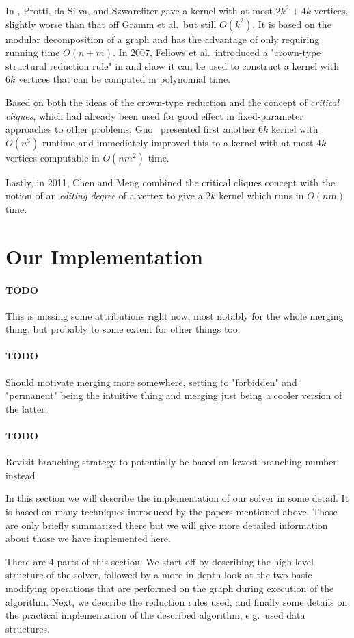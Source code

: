 \documentclass{article}
\newcommand{\todo}[1]{\paragraph{TODO} #1}
\theoremstyle{definition}
\begin{document}
In \cite[2006]{Protti}, Protti, da Silva, and Szwarcfiter gave a kernel with at most $2k^2 + 4k$
vertices, slightly worse than that off Gramm et al.\ but still $O(k^2)$. It is based on the modular
decomposition of a graph and has the advantage of only requiring running time $O(n + m)$. In 2007,
Fellows et al.\ introduced a "crown-type structural reduction rule" in \cite{Fellows} and show it
can be used to construct a kernel with $6k$ vertices that can be computed in polynomial time.

Based on both the ideas of the crown-type reduction and the concept of \emph{critical cliques},
which had already been used for good effect in fixed-parameter approaches to other problems,
Guo~\cite{Guo} presented first another $6k$ kernel with $O(n^3)$ runtime and immediately improved
this to a kernel with at most $4k$ vertices computable in $O(nm^2)$ time.

Lastly, in 2011, Chen and Meng \cite{ChenMeng} combined the critical cliques concept with the notion
of an \emph{editing degree} of a vertex to give a $2k$ kernel which runs in $O(nm)$ time.

\section{Our Implementation}

\todo This is missing some attributions right now, most notably for the whole merging thing, but
probably to some extent for other things too.

\todo Should motivate merging more somewhere, setting to "forbidden" and "permanent" being the
intuitive thing and merging just being a cooler version of the latter.

\todo Revisit branching strategy to potentially be based on lowest-branching-number instead

In this section we will describe the implementation of our solver in some detail. It is based on
many techniques introduced by the papers mentioned above. Those are only briefly summarized there
but we will give more detailed information about those we have implemented here.

There are 4 parts of this section: We start off by describing the high-level structure of the
solver, followed by a more in-depth look at the two basic modifying operations that are performed on
the graph during execution of the algorithm. Next, we describe the reduction rules used, and finally
some details on the practical implementation of the described algorithm, e.g.\ used data structures.
\end{document}
